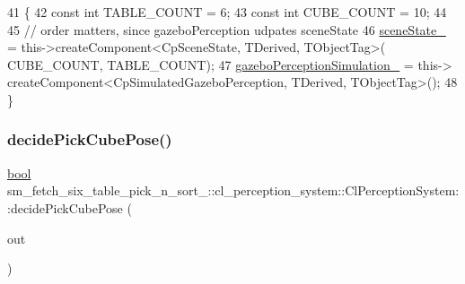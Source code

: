 \begin{DoxyCode}
41             \{
42                 \textcolor{keyword}{const} \textcolor{keywordtype}{int} TABLE\_COUNT = 6;
43                 \textcolor{keyword}{const} \textcolor{keywordtype}{int} CUBE\_COUNT = 10;
44 
45                 \textcolor{comment}{// order matters, since gazeboPerception udpates sceneState}
46                 \hyperlink{classsm__fetch__six__table__pick__n__sort__1_1_1cl__perception__system_1_1ClPerceptionSystem_abf68c35d49ab0c766521e23f4e3b4d41}{sceneState\_} = this->createComponent<CpSceneState, TDerived, TObjectTag>(
      CUBE\_COUNT, TABLE\_COUNT);
47                 \hyperlink{classsm__fetch__six__table__pick__n__sort__1_1_1cl__perception__system_1_1ClPerceptionSystem_a35f95a434ce0c5c8f1a0d3b35cc69035}{gazeboPerceptionSimulation\_} = this->
      createComponent<CpSimulatedGazeboPerception, TDerived, TObjectTag>();
48             \}
\end{DoxyCode}
\mbox{\label{classsm__fetch__six__table__pick__n__sort__1_1_1cl__perception__system_1_1ClPerceptionSystem_ada6bee3141c1a45d1b7a0a74b2d13a7a}} 
\subsubsection{\texorpdfstring{decide\+Pick\+Cube\+Pose()}{decidePickCubePose()}}
{\footnotesize\ttfamily \hyperlink{classbool}{bool} sm\+\_\+fetch\+\_\+six\+\_\+table\+\_\+pick\+\_\+n\+\_\+sort\+\_\+::cl\+\_\+perception\+\_\+system\+::\+Cl\+Perception\+System\+::decide\+Pick\+Cube\+Pose (\begin{DoxyParamCaption}\item[{geometry\+\_\+msgs\+::\+Pose\+Stamped \&}]{out }\end{DoxyParamCaption})\hspace{0.3cm}{\ttfamily [inline]}}



